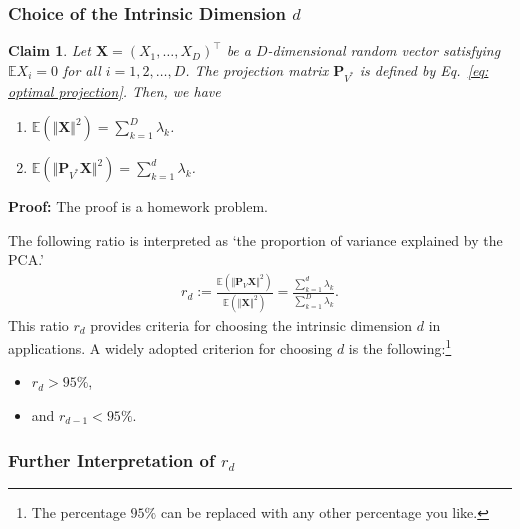 \documentclass[11pt,letterpaper, leqno]{article}
\newtheorem{claim}[theorem]{Claim}
\numberwithin{equation}{section}
\numberwithin{theorem}{section}
\numberwithin{lemma}{section}
\numberwithin{corollary}{section}
\numberwithin{definition}{section}
\numberwithin{proposition}{section}
\numberwithin{remark}{section}
\numberwithin{example}{section}
\newcommand{\T}{\intercal}
\begin{document}
\subsubsection{Choice of the Intrinsic Dimension $d$}

\begin{claim}\label{claim: variance and trace}
Let $\boldsymbol{X}=(X_1,\ldots,X_D)^\T$ be a $D$-dimensional random vector satisfying $\mathbb{E}X_i=0$ for all $i=1,2,\ldots,D$. The projection matrix $\boldsymbol{P}_{V^*}$ is defined by Eq.~\eqref{eq: optimal projection}. Then, we have
    \begin{enumerate}
        \item $\mathbb{E}\left(\Vert \boldsymbol{X}\Vert^2\right) = \sum_{k=1}^D \lambda_k$.

        \item $ \mathbb{E}\left( \Vert \boldsymbol{P}_{V^*} \boldsymbol{X} \Vert^2 \right) =\sum_{k=1}^d \lambda_k$.
    \end{enumerate}
\end{claim}

\textbf{Proof:} The proof is a homework problem.

The following ratio is interpreted as `the proportion of variance explained by the PCA.'
\begin{align*}
    \boxed{ r_d:= \frac{ \mathbb{E}\left( \Vert \boldsymbol{P}_V \boldsymbol{X} \Vert^2 \right) }{ \mathbb{E}\left(\Vert \boldsymbol{X}\Vert^2\right) } = \frac{\sum_{k=1}^d \lambda_k}{\sum_{k=1}^D \lambda_k}.}
\end{align*}
This ratio $r_d$ provides criteria for choosing the intrinsic dimension $d$ in applications. A widely adopted criterion for choosing $d$ is the following:\footnote{The percentage $95\%$ can be replaced with any other percentage you like.}
\begin{itemize}
    \item $r_d>95\%$,
    \item and $r_{d-1}<95\%$.
\end{itemize}

\subsubsection{Further Interpretation of $r_d$}
\end{document}
